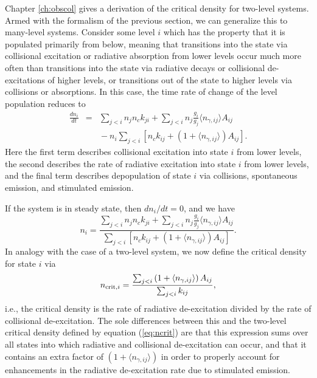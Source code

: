 Chapter \ref{ch:obscol} gives a derivation of the critical density for two-level systems. Armed with the formalism of the previous section, we can generalize this to many-level systems. Consider some level $i$ which has the property that it is populated primarily from below, meaning that transitions into the state via collisional excitation or radiative absorption from lower levels occur much more often than transitions into the state via radiative decays or collisional de-excitations of higher levels, or transitions out of the state to higher levels via collisions or absorptions. In this case, the time rate of change of the level population reduces to
\begin{eqnarray}
\frac{dn_i}{dt} & = & \sum_{j<i} n_j n_c k_{ji} + \sum_{j<i} n_j \frac{g_i}{g_j} \langle n_{\gamma,ij}\rangle A_{ij}
\nonumber \\
& & {} - n_i \sum_{j<i} \left[n_c k_{ij} + \left(1+\langle n_{\gamma,ij}\rangle\right)A_{ij}\right].
\end{eqnarray}
Here the first term describes collisional excitation into state $i$ from lower levels, the second describes the rate of radiative excitation into state $i$ from lower levels, and the final term describes depopulation of state $i$ via collisions, spontaneous emission, and stimulated emission.

If the system is in steady state, then $dn_i/dt = 0$, and we have
\begin{equation}
\label{eq:nsteady}
n_i = \frac{\sum_{j<i} n_j n_c k_{ji} + \sum_{j<i} n_j \frac{g_i}{g_j} \langle n_{\gamma,ij}\rangle A_{ij}}{\sum_{j<i} \left[n_c k_{ij} + \left(1 + \langle n_{\gamma,ij}\rangle\right)A_{ij}\right]}.
\end{equation}
In analogy with the case of a two-level system, we now define the critical density for state $i$ via
\begin{equation}
n_{{\rm crit},i} = \frac{\sum_{j<i} \left(1 + \langle n_{\gamma,ij}\rangle\right) A_{ij}}{\sum_{j<i} k_{ij}},
\end{equation}
i.e., the critical density is the rate of radiative de-excitation divided by the rate of collisional de-excitation. The sole differences between this and the two-level critical density defined by equation (\ref{eq:ncrit}) are that this expression sums over all states into which radiative and collisional de-excitation can occur, and that it contains an extra factor of $ \left(1 + \langle n_{\gamma,ij}\rangle\right)$ in order to properly account for enhancements in the radiative de-excitation rate due to stimulated emission.

